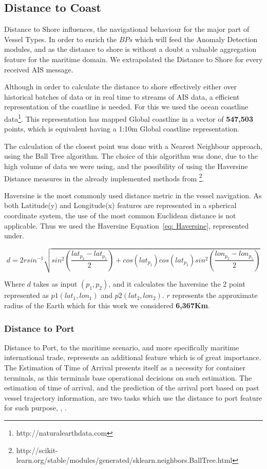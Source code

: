 \subsection{Distance to Coast}
\label{subsection: Distance to Coast}
Distance to Shore influences, the navigational behaviour for the major part of Vessel Types. In order to enrich the $BPs$ which will feed the Anomaly Detection modules, and as the distance to shore is without a doubt a valuable aggregation feature for the maritime domain. We extrapolated the Distance to Shore for every received AIS message. 

Although in order to calculate the distance to shore effectively either over historical batches of data or in real time to streams of AIS data, a efficient representation of the coastline is needed. 
For this we used the ocean coastline data\footnote{http://naturalearthdata.com}. This representation has mapped Global coastline in a vector of \textbf{547,503} points, which is equivalent having a 1:10m Global coastline representation.

The calculation of the closest point was done with a Nearest Neighbour approach, using the Ball Tree algorithm. The choice of this algorithm was done, due to the high volume of data we were using, and the possibility of using the Haversine Distance measures in the already implemented methods from \footnote{http://scikit-learn.org/stable/modules/generated/sklearn.neighbors.BallTree.html}.

Haversine is the most commonly used distance metric in the vessel navigation. As both Latitude(y) and Longitude(x) features are represented in a spherical coordinate system, the use of the most common Euclidean distance is not applicable. Thus we used the Haversine Equation~\ref{eq: Haversine}, represented under.

\begin{equation}
d = 2r sin ^{-1} \sqrt{sin^2(\frac{lat_{p_2}-lat_{p_1}}{2})+cos(lat_{p_1})cos(lat_{p_2})sin^2(\frac{lon_{p_2}-lon_{p_1}}{2})}
\label{eq: Haversine}
\end{equation}

Where $d$ takes as input $({p_1}, {p_2})$, and it calculates the haversine the 2 point represented as $p1(lat_1, lon_1)$ and $p2(lat_2, lon_2)$. $r$ represents the approximate radius of the Earth which for this work we considered \textbf{6,367Km}.

\subsubsection{Distance to Port}
Distance to Port, to the maritime scenario, and more specifically maritime international trade, represents an additional feature which is of great importance. The Estimation of Time of Arrival presents itself as a necessity for container terminals, as this terminals base operational decisions on such estimation. The estimation of time of arrival, and the prediction of the arrival port based on past vessel trajectory information, are two tasks which use the distance to port feature for such purpose, \cite{Moussa2018ScalableSpark}, \cite{Rosca2018PredictingRoutes}.

